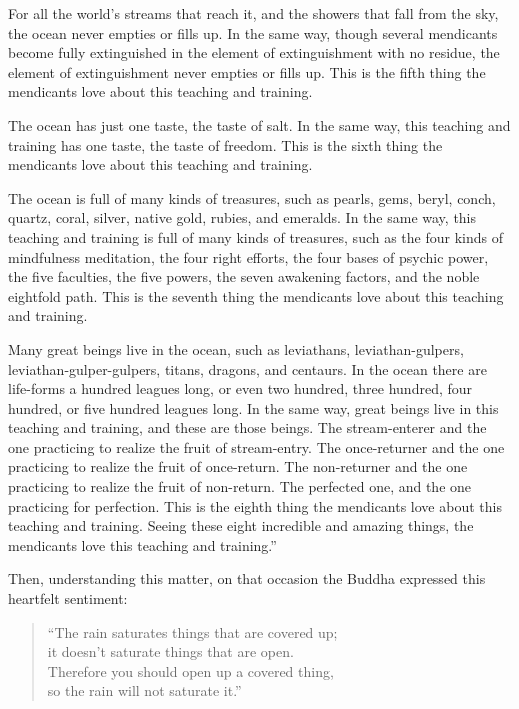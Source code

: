 \documentclass[12pt,openany]{book}%
\begin{document}
For all the world’s streams that reach it, and the showers that fall from the sky, the ocean never empties or fills up. In the same way, though several mendicants become fully extinguished in the element of extinguishment with no residue, the element of extinguishment never empties or fills up. This is the fifth thing the mendicants love about this teaching and training. 

The ocean has just one taste, the taste of salt. In the same way, this teaching and training has one taste, the taste of freedom. This is the sixth thing the mendicants love about this teaching and training. 

The ocean is full of many kinds of treasures, such as pearls, gems, beryl, conch, quartz, coral, silver, native gold, rubies, and emeralds. In the same way, this teaching and training is full of many kinds of treasures, such as the four kinds of mindfulness meditation, the four right efforts, the four bases of psychic power, the five faculties, the five powers, the seven awakening factors, and the noble eightfold path. This is the seventh thing the mendicants love about this teaching and training. 

Many great beings live in the ocean, such as leviathans, leviathan-gulpers, leviathan-gulper-gulpers, titans, dragons, and centaurs. In the ocean there are life-forms a hundred leagues long, or even two hundred, three hundred, four hundred, or five hundred leagues long. In the same way, great beings live in this teaching and training, and these are those beings. The stream-enterer and the one practicing to realize the fruit of stream-entry. The once-returner and the one practicing to realize the fruit of once-return. The non-returner and the one practicing to realize the fruit of non-return. The perfected one, and the one practicing for perfection. This is the eighth thing the mendicants love about this teaching and training. Seeing these eight incredible and amazing things, the mendicants love this teaching and training.” 

Then, understanding this matter, on that occasion the Buddha expressed this heartfelt sentiment: 

\begin{verse}%
“The rain saturates things that are covered up; \\
it doesn’t saturate things that are open. \\
Therefore you should open up a covered thing, \\
so the rain will not saturate it.” 

%
\end{verse}
\end{document}
